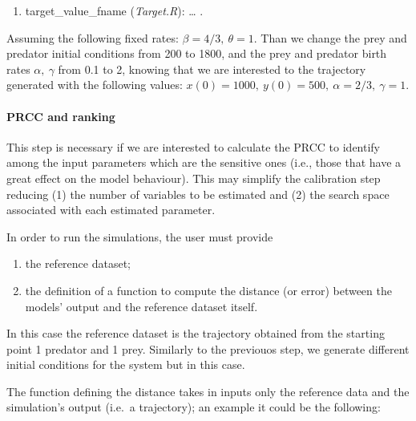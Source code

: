 \documentclass[
]{article}
\providecommand{\tightlist}{%
  \setlength{\itemsep}{0pt}\setlength{\parskip}{0pt}}
\begin{document}
\begin{enumerate}
\def\labelenumi{\arabic{enumi}.}
\setcounter{enumi}{5}
\tightlist
\item
  target\_value\_fname (\emph{Target.R}): \ldots{} .
\end{enumerate}

Assuming the following fixed rates: \(\beta = 4/3,\  \theta = 1.\) Than
we change the prey and predator initial conditions from 200 to 1800, and
the prey and predator birth rates \(\alpha,\ \gamma\) from 0.1 to 2,
knowing that we are interested to the trajectory generated with the
following values:
\(x(0) = 1000,\ y(0)=500,\ \alpha = 2/3,\ \gamma = 1\).

\hypertarget{prcc-and-ranking}{%
\paragraph{PRCC and ranking}\label{prcc-and-ranking}}

This step is necessary if we are interested to calculate the PRCC to
identify among the input parameters which are the sensitive ones (i.e.,
those that have a great effect on the model behaviour). This may
simplify the calibration step reducing (1) the number of variables to be
estimated and (2) the search space associated with each estimated
parameter.

In order to run the simulations, the user must provide

\begin{enumerate}
\def\labelenumi{\arabic{enumi}.}
\tightlist
\item
  the reference dataset;
\item
  the definition of a function to compute the distance (or error)
  between the models' output and the reference dataset itself.
\end{enumerate}

In this case the reference dataset is the trajectory obtained from the
starting point 1 predator and 1 prey. Similarly to the previouos step,
we generate different initial conditions for the system but in this
case.

The function defining the distance takes in inputs only the reference
data and the simulation's output (i.e.~a trajectory); an example it
could be the following:
\end{document}
